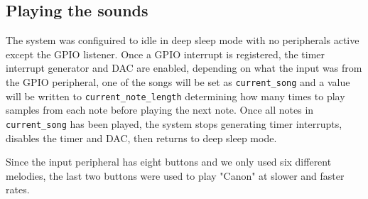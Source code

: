 \subsection{Playing the sounds}
The system was configuired to idle in deep sleep mode with no peripherals active except the GPIO listener. Once a GPIO interrupt is registered, the timer interrupt generator and DAC are enabled, depending on what the input was from the GPIO peripheral, one of the songs will be set as \texttt{current\_song} and a value will be written to \texttt{current\_note\_length} determining how many times to play samples from each note before playing the next note. Once all notes in \texttt{current\_song} has been played, the system stops generating timer interrupts, disables the timer and DAC, then returns to deep sleep mode.

Since the input peripheral has eight buttons and we only used six different melodies, the last two buttons were used to play "Canon" at slower and faster rates.
